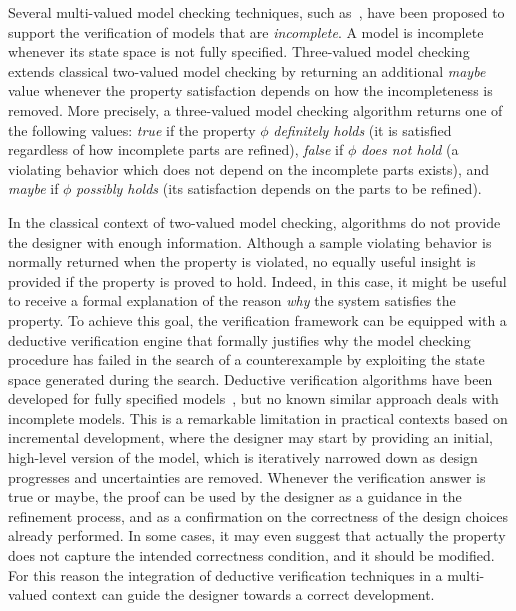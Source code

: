 Several multi-valued model checking techniques, such as~\cite{bruns1999model,bruns2000model,gurfinkel2003multi,bruns2004MCmultivalued}, have been proposed to support the verification of models that are \emph{incomplete}.
A model is incomplete whenever its state space is not fully specified.
Three-valued model checking extends classical two-valued model checking by returning an additional \emph{maybe} value whenever the property satisfaction depends on how the incompleteness is removed.
More precisely, a three-valued model checking algorithm returns one of the following values: \emph{true} if the property $\phi$ \emph{definitely holds} (it is satisfied regardless of how incomplete parts are refined), \emph{false} if $\phi$ \emph{does not hold} (a violating behavior which does not depend on the incomplete parts exists), and \emph{maybe} if $\phi$ \emph{possibly holds} (its satisfaction depends on the parts to be refined).

In the classical context of two-valued model checking, algorithms do not provide the designer with enough information.
Although a sample violating behavior is normally returned when the property is violated, no equally useful insight is provided if the property is proved to hold. 
Indeed, in this case, it might be useful to receive a formal explanation of the reason \emph{why} the system satisfies the property.
To achieve this goal, the verification framework can be equipped with a deductive verification engine that formally justifies why the model checking procedure has failed in the search of a counterexample by exploiting the state space generated during the search.
Deductive verification algorithms have been developed for fully specified models~\cite{peled2001model,peled2001falsification}, but no known similar approach deals with incomplete models.
This is a remarkable limitation in practical contexts based on incremental development, where the designer may start by providing an initial, high-level version of the model, which is iteratively narrowed down as design progresses and uncertainties are removed.
Whenever the verification answer is true or maybe, the proof can be used by the designer as a guidance in the refinement process, and as a confirmation on the correctness of the design choices already performed. 
In some cases, it may even suggest that actually the property does not capture the intended correctness condition, and it should be modified.
For this reason the integration of deductive verification techniques in a multi-valued context can guide the designer towards a correct development.


